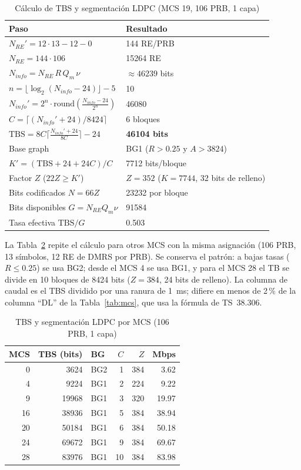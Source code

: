 \documentclass[conference]{IEEEtran}
\begin{document}
\begin{table}[!t]
\caption{Cálculo de TBS y segmentación LDPC (MCS 19, 106 PRB, 1 capa)}
\label{tab:tbs}
\centering
\footnotesize
\renewcommand{\arraystretch}{1.15}
\begin{tabular}{p{3.3cm}p{4.4cm}}
\toprule
\textbf{Paso} & \textbf{Resultado} \\
\midrule
$N_{RE}'=12\cdot13-12-0$ & 144 RE/PRB \\
$N_{RE}=144\cdot106$ & 15264 RE \\
$N_{info}=N_{RE}\,R\,Q_m\,\nu$ & $\approx46239$ bits \\
$n=\lfloor\log_2(N_{info}-24)\rfloor-5$ & 10 \\
$N_{info}'=2^n\cdot\mathrm{round}\!\left(\tfrac{N_{info}-24}{2^n}\right)$ & 46080 \\
$C=\lceil(N_{info}'+24)/8424\rceil$ & 6 bloques \\
$\mathrm{TBS}=8C\lceil\tfrac{N_{info}'+24}{8C}\rceil-24$ & \textbf{46104 bits} \\
Base graph & BG1 ($R>0.25$ y $A>3824$) \\
$K'=(\mathrm{TBS}+24+24C)/C$ & 7712 bits/bloque \\
Factor $Z$ ($22Z\ge K'$) & $Z=352$ ($K=7744$, 32 bits de relleno) \\
Bits codificados $N=66Z$ & 23232 por bloque \\
Bits disponibles $G=N_{RE}Q_m\nu$ & 91584 \\
Tasa efectiva $\mathrm{TBS}/G$ & 0.503 \\
\bottomrule
\end{tabular}
\end{table}

La Tabla~\ref{tab:tbsmcs} repite el cálculo para otros MCS con la misma asignación (106 PRB, 13 símbolos, 12 RE de DMRS por PRB). Se conserva el patrón: a bajas tasas ($R\le0.25$) se usa BG2; desde el MCS 4 se usa BG1, y para el MCS 28 el TB se divide en 10 bloques de 8424 bits ($Z=384$, 24 bits de relleno). La columna de caudal es el TBS dividido por una ranura de 1~ms; difiere en menos de 2\,\% de la columna ``DL'' de la Tabla~\ref{tab:mcs}, que usa la fórmula de TS~38.306.

\begin{table}[!t]
\caption{TBS y segmentación LDPC por MCS (106 PRB, 1 capa)}
\label{tab:tbsmcs}
\centering
\footnotesize
\renewcommand{\arraystretch}{1.1}
\begin{tabular}{rrlrrr}
\toprule
\textbf{MCS} & \textbf{TBS (bits)} & \textbf{BG} & $C$ & $Z$ & \textbf{Mbps} \\
\midrule
0 & 3624 & BG2 & 1 & 384 & 3.62 \\
4 & 9224 & BG1 & 2 & 224 & 9.22 \\
9 & 19968 & BG1 & 3 & 320 & 19.97 \\
16 & 38936 & BG1 & 5 & 384 & 38.94 \\
20 & 50184 & BG1 & 6 & 384 & 50.18 \\
24 & 69672 & BG1 & 9 & 384 & 69.67 \\
28 & 83976 & BG1 & 10 & 384 & 83.98 \\
\bottomrule
\end{tabular}
\end{table}
\end{document}
